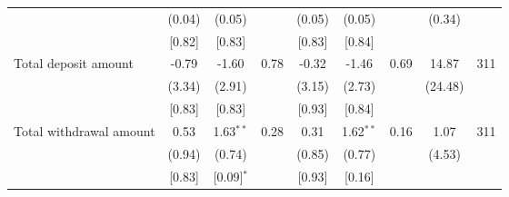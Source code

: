 \begin{table}[h]
{\begin{threeparttable}
\begin{tabular}{l*{8}{c}}
          &   (0.04)&   (0.05)&         &   (0.05)&   (0.05)&         &   (0.34)&         \\
          &   [0.82]&   [0.83]&         &   [0.83]&   [0.84]&         &         &         \\
Total deposit amount&    -0.79&    -1.60&     0.78&    -0.32&    -1.46&     0.69&    14.87&      311\\
          &   (3.34)&   (2.91)&         &   (3.15)&   (2.73)&         &  (24.48)&         \\
          &   [0.83]&   [0.83]&         &   [0.93]&   [0.84]&         &         &         \\
Total withdrawal amount&     0.53&1.63$^{**}$&     0.28&     0.31&1.62$^{**}$&     0.16&     1.07&      311\\
          &   (0.94)&   (0.74)&         &   (0.85)&   (0.77)&         &   (4.53)&         \\
          &   [0.83]&[0.09]$^{*}$&         &   [0.93]&   [0.16]&         &         &         \\
\bottomrule \end{tabular} \begin{tablenotes}[flushleft] \footnotesize \item  \end{tablenotes} \end{threeparttable} } \end{table}
